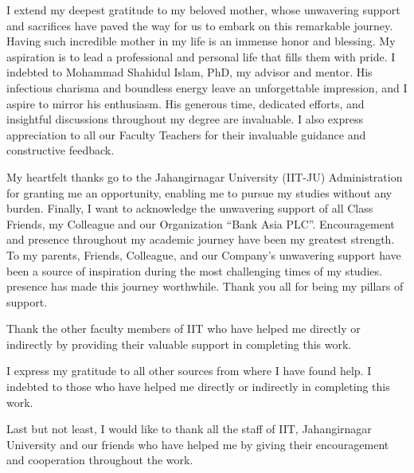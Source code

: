 I extend my deepest gratitude to my beloved mother, whose unwavering support and sacrifices have paved the way for us to embark on this remarkable journey. Having such incredible mother in my life is an immense honor and blessing. My aspiration is to lead a professional and personal life that fills them with pride. I indebted to Mohammad Shahidul Islam, PhD, my advisor and mentor. His infectious charisma and boundless energy leave an unforgettable impression, and I aspire to mirror his enthusiasm. His generous time, dedicated efforts, and insightful discussions throughout my degree are invaluable. I also express appreciation to all our Faculty Teachers for their invaluable guidance and constructive feedback.







My heartfelt thanks go to the Jahangirnagar University (IIT-JU) Administration for granting me an opportunity, enabling me to pursue my studies without any burden.
Finally, I want to acknowledge the unwavering support of all Class Friends, my Colleague and our Organization “Bank Asia PLC”. Encouragement and presence throughout my academic journey have been my greatest strength. To my parents, Friends, Colleague, and our Company’s unwavering support have been a source of inspiration during the most challenging times of my studies. presence has made this journey worthwhile. Thank you all for being my pillars of support.


Thank the other faculty members of IIT who have helped me directly or indirectly by providing their valuable support in completing this work.

I express my gratitude to all other sources from where I have found help. I indebted to those who have helped me directly or indirectly in completing this work.

Last but not least, I would like to thank all the staff of IIT, Jahangirnagar University and our friends who have helped me by giving their encouragement and cooperation throughout the work.